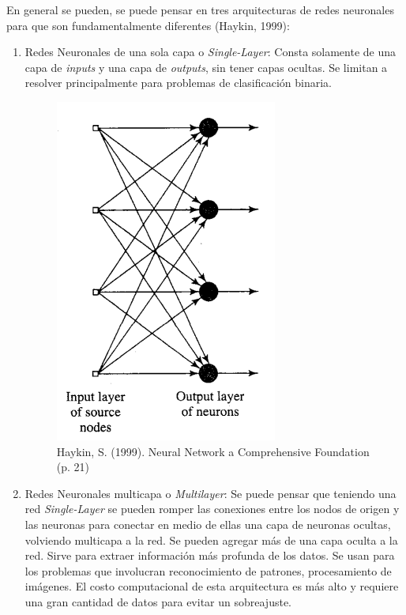 \documentclass[14pt,a4paper]{report}
\begin{document}
En general se pueden, se puede pensar en tres arquitecturas de redes neuronales para que son fundamentalmente diferentes (Haykin, 1999):\\
\begin{enumerate}


\item Redes Neuronales de una sola capa o \textit{Single-Layer}: Consta solamente de una capa de \textit{inputs} y una capa de \textit{outputs}, sin tener capas ocultas. Se limitan a resolver principalmente para problemas de clasificación binaria.

 \begin{figure}[h]
  \centering
  \includegraphics[scale=0.6]{../single-layer-NN.png} 
  \caption{Haykin, S. (1999). Neural Network a Comprehensive Foundation (p. 21)}
  \label{fig:neural-network}
\end{figure}
 

\item Redes Neuronales multicapa o \textit{Multilayer}: Se puede pensar que teniendo una red \textit{Single-Layer} se pueden romper las conexiones entre los nodos de origen y las neuronas para conectar en medio de ellas una capa de neuronas ocultas, volviendo multicapa a la red. Se pueden agregar más de una capa oculta a la red. Sirve para extraer información más profunda de los datos. Se usan para los problemas que involucran reconocimiento de patrones, procesamiento de imágenes. El costo computacional de esta arquitectura es más alto y requiere una gran cantidad de datos para evitar un sobreajuste.


\end{enumerate}
\end{document}

